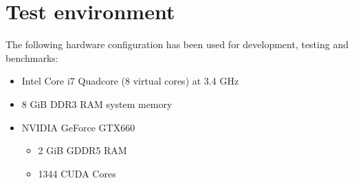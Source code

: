 \section{Test environment}
\label{sec:test_environment}

The following hardware configuration has been used for development, testing and benchmarks:

\begin{itemize}
	\item Intel Core i7 Quadcore (8 virtual cores) at 3.4 GHz
	\item 8 GiB DDR3 RAM system memory
	\item NVIDIA GeForce GTX660
	\begin{itemize}
		\item 2 GiB GDDR5 RAM
		\item 1344 CUDA Cores
	\end{itemize}
\end{itemize}
